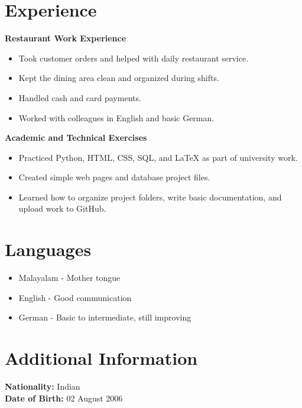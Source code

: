 \documentclass[11pt,a4paper]{article}
\begin{document}

\section*{Experience}

\textbf{Restaurant Work Experience}

\begin{itemize}
    \item Took customer orders and helped with daily restaurant service.
    \item Kept the dining area clean and organized during shifts.
    \item Handled cash and card payments.
    \item Worked with colleagues in English and basic German.
\end{itemize}

\vspace{0.2cm}

\textbf{Academic and Technical Exercises}

\begin{itemize}
    \item Practiced Python, HTML, CSS, SQL, and LaTeX as part of university work.
    \item Created simple web pages and database project files.
    \item Learned how to organize project folders, write basic documentation, and upload work to GitHub.
\end{itemize}


\section*{Languages}

\begin{itemize}
    \item Malayalam - Mother tongue
    \item English - Good communication
    \item German - Basic to intermediate, still improving
\end{itemize}


\section*{Additional Information}

\textbf{Nationality:} Indian \\  
\textbf{Date of Birth:} 02 August 2006
\end{document}
